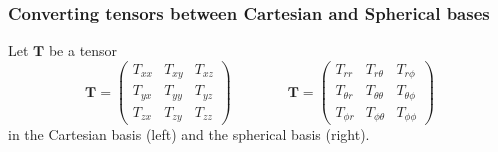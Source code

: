 \subsubsection{Converting tensors between Cartesian and Spherical bases \label{ss:convcartspher}}

Let ${\bm T}$ be a tensor
\[
{\bm T}=
\left(
\begin{array}{ccc}
T_{xx} & T_{xy} & T_{xz} \\
T_{yx} & T_{yy} & T_{yz} \\
T_{zx} & T_{zy} & T_{zz} 
\end{array}
\right)
\qquad\qquad
{\bm T}=
\left(
\begin{array}{ccc}
T_{rr}       & T_{r\theta}      & T_{r\phi} \\
T_{\theta r} & T_{\theta\theta} & T_{\theta\phi} \\
T_{\phi r}   & T_{\phi \theta}  & T_{\phi\phi}
\end{array}
\right)
\]
in the Cartesian basis (left) and the spherical basis (right).

